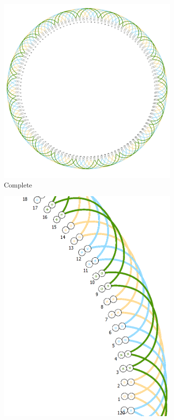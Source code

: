 \documentclass[a4paper, 11pt]{article}
\begin{document}
\begin{figure}[h!]
    \centering
    \begin{subfigure}[b]{0.6\textwidth}
        \includegraphics[width=\textwidth]{Q1_windingDiagram_dolomites.jpg}
        \caption{Complete}
        \label{subfig:winding_dolomites}
    \end{subfigure}
    \begin{subfigure}[b]{0.35\textwidth}
        \includegraphics[width=\textwidth]{Q1_windingDiagram_1pp_dolomites.png}

\end{subfigure}
\end{figure}
\end{document}
